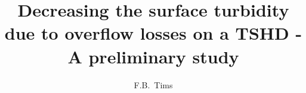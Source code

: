 \documentclass{tudelft-report}
\begin{document}
\frontmatter

\title{Decreasing the surface turbidity due to overflow losses on a TSHD - A preliminary study}
\author{F.B.\ Tims}
\makecover







\tableofcontents
\listoffigures
\listoftables
%
\printnomenclature


\mainmatter











\appendix









%

\end{document}
